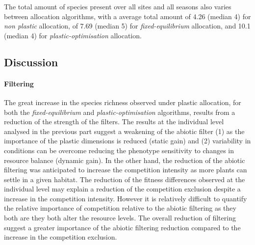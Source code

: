 The total amount of species present over all sites and all seasons also varies between allocation algorithms, with a average total amount of 4.26 (median 4) for \textit{non plastic} allocation, of 7.69 (median 5) for \textit{fixed-equilibrium} allocation, and 10.1 (median 4) for \textit{plastic-optimisation} allocation.



\subsection{Discussion}



\paragraph{Filtering} 
The great increase in the species richness observed under plastic allocation, for both the \textit{fixed-equilibrium} and \textit{plastic-optimisation} algorithms,  
results from a reduction of the strength of the filters. The results at the individual level analysed in the previous part suggest a weakening of the abiotic filter (1) as the importance of the plastic dimensions is reduced (static gain) and (2) variability in conditions can be overcome reducing the phenotype sensitivity to changes in resource balance (dynamic gain). In the other hand, the reduction of the abiotic filtering was anticipated to increase the competition intensity as more plants can settle in a given habitat. The reduction of the fitness differences observed at the individual level may explain a reduction of the competition exclusion despite a increase in the competition intensity. However it is relatively difficult to quantify the relative importance of competition relative to the abiotic filtering as they both are they both alter the resource levels. The overall reduction of filtering suggest a greater importance of the abiotic filtering reduction compared to the increase in the competition exclusion.


